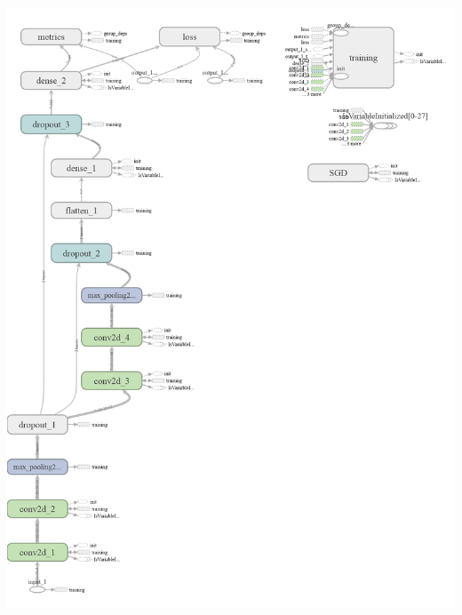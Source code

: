 \documentclass[a4paper,11pt]{article}
\begin{document}
\begin{itemize}
\begin{minipage}{\linewidth}
		\includegraphics[width=1\linewidth]{cifar100-graph}
	\end{minipage}


\end{itemize}
\end{document}
